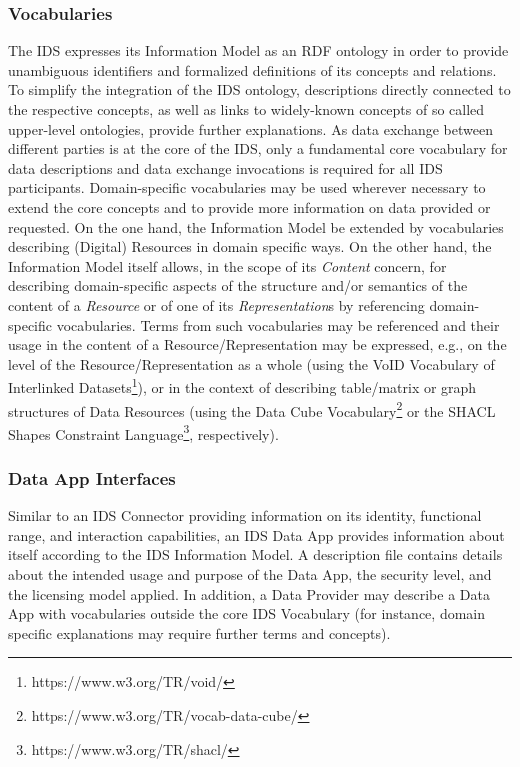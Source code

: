\subsubsection{Vocabularies}
The IDS expresses its Information Model as an RDF ontology in order to provide unambiguous identifiers and formalized definitions of its concepts and relations. To simplify the integration of the IDS ontology, descriptions directly connected to the respective concepts, as well as links to widely-known concepts of so called upper-level ontologies, provide further explanations. As data exchange between different parties is at the core of the IDS, only a fundamental core vocabulary for data descriptions and data exchange invocations is required for all IDS participants. Domain-specific vocabularies may be used wherever necessary to extend the core concepts and to provide more information on data provided or requested. On the one hand, the Information Model be extended by vocabularies describing (Digital) Resources in domain specific ways. On the other hand, the Information Model itself allows, in the scope of its \textit{Content} concern, for describing domain-specific aspects of the structure and/or semantics of the content of a \textit{Resource} or of one of its \textit{Representation}s by referencing domain-specific vocabularies. Terms from such vocabularies may be referenced and their usage in the content of a Resource/Representation may be expressed, e.g., on the level of the Resource/Representation as a whole (using the VoID Vocabulary of Interlinked Datasets\footnote{https://www.w3.org/TR/void/ }), or in the context of describing table/matrix or graph structures of Data Resources (using the Data Cube Vocabulary\footnote{https://www.w3.org/TR/vocab-data-cube/ } or the SHACL Shapes Constraint Language\footnote{https://www.w3.org/TR/shacl/ }, respectively).

\subsubsection{Data App Interfaces}
Similar to an IDS Connector providing information on its identity, functional range, and interaction capabilities, an IDS Data App provides information about itself according to the IDS Information Model. A description file contains details about the intended usage and purpose of the Data App, the security level, and the licensing model applied. In addition, a Data Provider may describe a Data App with vocabularies outside the core IDS Vocabulary (for instance, domain specific explanations may require further terms and concepts).

